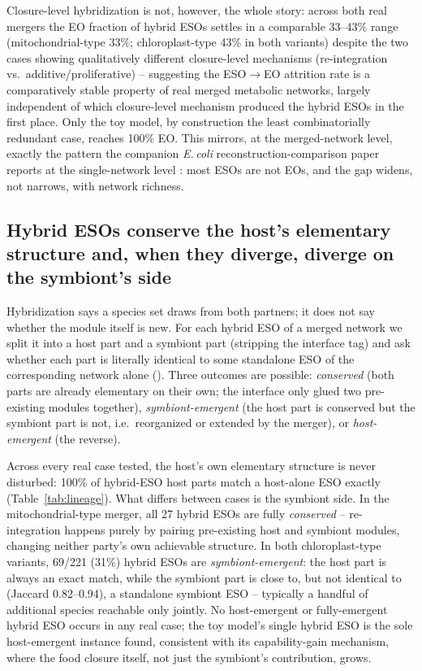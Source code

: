 \documentclass[9pt,twocolumn,twoside]{pnas-new}
\begin{document}
Closure-level hybridization is not, however, the whole story: across both real mergers the EO fraction of hybrid ESOs settles in a comparable 33--43\% range (mitochondrial-type 33\%; chloroplast-type 43\% in both variants) despite the two cases showing qualitatively different closure-level mechanisms (re-integration vs.\ additive/proliferative) -- suggesting the ESO$\to$EO attrition rate is a comparatively stable property of real merged metabolic networks, largely independent of which closure-level mechanism produced the hybrid ESOs in the first place. Only the toy model, by construction the least combinatorially redundant case, reaches 100\% EO. This mirrors, at the merged-network level, exactly the pattern the companion \textit{E.\,coli} reconstruction-comparison paper reports at the single-network level \cite{velozecoli2026}: most ESOs are not EOs, and the gap widens, not narrows, with network richness.

\subsection*{Hybrid ESOs conserve the host's elementary structure and, when they diverge, diverge on the symbiont's side}
Hybridization says a species set draws from both partners; it does not say whether the module itself is new. For each hybrid ESO of a merged network we split it into a host part and a symbiont part (stripping the interface tag) and ask whether each part is literally identical to some standalone ESO of the corresponding network alone (\matmethods{}). Three outcomes are possible: \emph{conserved} (both parts are already elementary on their own; the interface only glued two pre-existing modules together), \emph{symbiont-emergent} (the host part is conserved but the symbiont part is not, i.e.\ reorganized or extended by the merger), or \emph{host-emergent} (the reverse).

Across every real case tested, the host's own elementary structure is never disturbed: 100\% of hybrid-ESO host parts match a host-alone ESO exactly (Table~\ref{tab:lineage}). What differs between cases is the symbiont side. In the mitochondrial-type merger, all 27 hybrid ESOs are fully \emph{conserved} -- re-integration happens purely by pairing pre-existing host and symbiont modules, changing neither party's own achievable structure. In both chloroplast-type variants, 69/221 (31\%) hybrid ESOs are \emph{symbiont-emergent}: the host part is always an exact match, while the symbiont part is close to, but not identical to (Jaccard 0.82--0.94), a standalone symbiont ESO -- typically a handful of additional species reachable only jointly. No host-emergent or fully-emergent hybrid ESO occurs in any real case; the toy model's single hybrid ESO is the sole host-emergent instance found, consistent with its capability-gain mechanism, where the food closure itself, not just the symbiont's contribution, grows.
\end{document}
